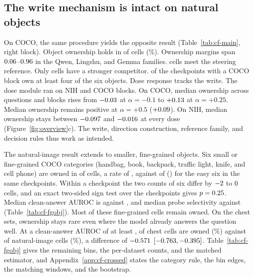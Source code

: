 \documentclass{article}
\begin{document}
\subsection{The write mechanism is intact on natural objects}
\label{sec:coco}

On COCO, the same procedure yields the opposite result (Table~\ref{tab:cf-main}, right block). Object ownership holds in \cfCocoOwned{} of \cfCocoOwnedN{} cells (\cfCocoOwnedPct\%). Ownership margins span $0.06$--$0.96$ in the Qwen, Lingshu, and Gemma families. \cfCocoRefMet{} cells meet the steering reference. Only \cfCocoCompetitor{} cells have a stronger competitor. \cfCocoBlocksFourPlus{} of the \cfCocoBlocks{} checkpoints with a COCO block own at least four of the six objects. Dose response tracks the write. The dose module ran on \cfDoseBlocksNih{} NIH and \cfDoseBlocksCoco{} COCO blocks. On COCO, median ownership across questions and blocks rises from $-0.03$ at $\alpha=-0.1$ to $+0.13$ at $\alpha=+0.25$. Median ownership remains positive at $\alpha=+0.5$ ($+0.09$). On NIH, median ownership stays between $-0.097$ and $-0.016$ at every dose (Figure~\ref{fig:overview}c). The write, direction construction, reference family, and decision rules thus work as intended.

The natural-image result extends to smaller, fine-grained objects. Six small or fine-grained COCO categories (handbag, book, backpack, traffic light, knife, and cell phone) are owned in \cfFgFineOwned{} of \cfFgFineCells{} cells, a rate of \cfFgFineRate{}, against \cfFgEasySameOwned{} of \cfFgEasySameCells{} (\cfFgEasySameRate{}) for the easy six in the same \cfFgSameBlocks{} checkpoints. Within a checkpoint the two counts of six differ by $-2$ to $0$ cells, and an exact two-sided sign test over the checkpoints gives $p=0.25$. Median clean-answer AUROC is \cfFgFineAuroc{} against \cfFgEasySameAuroc{}, and median probe selectivity \cfFgFineSel{} against \cfFgEasySameSel{} (Table~\ref{tab:cf-fgobj}). Most of these fine-grained cells remain owned. On the chest sets, ownership stays rare even where the model already answers the question well. At a clean-answer AUROC of at least \cfStratTopEdge{}, \cfStratChestTopOwned{} of \cfStratChestTopN{} chest cells are owned (\cfStratChestTopPct\%) against \cfStratNatTopOwned{} of \cfStratNatTopN{} natural-image cells (\cfStratNatTopPct\%), a difference of $-0.571$ $[-0.763,-0.395]$. Table~\ref{tab:cf-fgobj} gives the remaining bins, the per-dataset counts, and the matched estimator, and Appendix~\ref{app:cf-crossed} states the category rule, the bin edges, the matching windows, and the bootstrap.
\end{document}
